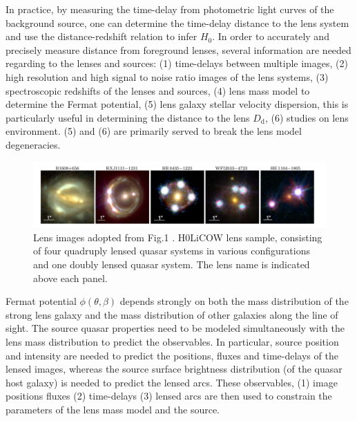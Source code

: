\documentclass{cosmo}
\begin{document}
    In practice, by measuring the time-delay from photometric light curves of the background source, one can determine the time-delay distance to the lens system and use the distance-redshift relation to infer $H_\mathrm{0}$. In order to accurately and precisely measure distance from foreground lenses, several information are needed regarding to the lenses and sources:
    (1) time-delays between multiple images, (2) high resolution and high signal to noise ratio images of the lens systems, (3) spectroscopic redshifts of the lenses and sources, (4) lens mass model to determine the Fermat potential, (5) lens galaxy stellar velocity dispersion, this is particularly useful in determining the distance to the lens $D_\mathrm{d}$, (6) studies on lens environment. (5) and (6) are primarily served to break the lens model degeneracies.
    
    \begin{figure}
        \centering
        \includegraphics[width=\textwidth]{fig1_2.png}
        \caption{Lens images adopted from Fig.1 \cite{Suyu2017}. H0LiCOW lens sample, consisting of four quadruply lensed quasar systems in various configurations and one doubly lensed quasar system. The lens name is indicated above each panel.}
        \label{fig1}
    \end{figure}
    
    Fermat potential $\phi(\theta, \beta)$ depends strongly on both the mass distribution of the strong lens galaxy and the mass distribution of other galaxies along the line of sight. The source quasar properties need to be modeled simultaneously with the lens mass distribution to predict the observables. In particular, source position and intensity are needed to predict the positions, fluxes and time-delays of the lensed images, whereas the source surface brightness distribution (of the quasar host galaxy) is needed to predict the lensed arcs. These observables, (1) image positions fluxes (2) time-delays (3) lensed arcs are then used to constrain the parameters of the lens mass model and the source.
    
\end{document}
